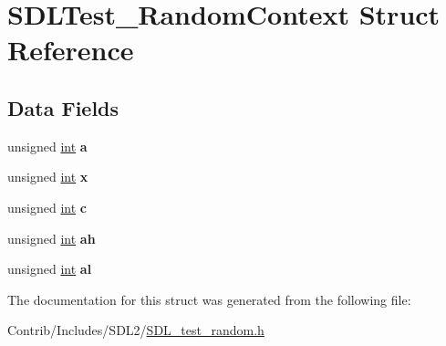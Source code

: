 \hypertarget{struct_s_d_l_test___random_context}{}\section{S\+D\+L\+Test\+\_\+\+Random\+Context Struct Reference}
\label{struct_s_d_l_test___random_context}
\subsection*{Data Fields}
\begin{DoxyCompactItemize}
\item 
unsigned \hyperlink{_s_d_l__thread_8h_a6a64f9be4433e4de6e2f2f548cf3c08e}{int} {\bfseries a}\hypertarget{struct_s_d_l_test___random_context_a0ea8a85723620c90be9fd2a693f12a59}{}\label{struct_s_d_l_test___random_context_a0ea8a85723620c90be9fd2a693f12a59}

\item 
unsigned \hyperlink{_s_d_l__thread_8h_a6a64f9be4433e4de6e2f2f548cf3c08e}{int} {\bfseries x}\hypertarget{struct_s_d_l_test___random_context_a676e0da0ef83bbbdf42538e54b97506b}{}\label{struct_s_d_l_test___random_context_a676e0da0ef83bbbdf42538e54b97506b}

\item 
unsigned \hyperlink{_s_d_l__thread_8h_a6a64f9be4433e4de6e2f2f548cf3c08e}{int} {\bfseries c}\hypertarget{struct_s_d_l_test___random_context_a6ce17b018c47d0f1d0e53a458f741ad3}{}\label{struct_s_d_l_test___random_context_a6ce17b018c47d0f1d0e53a458f741ad3}

\item 
unsigned \hyperlink{_s_d_l__thread_8h_a6a64f9be4433e4de6e2f2f548cf3c08e}{int} {\bfseries ah}\hypertarget{struct_s_d_l_test___random_context_a48cec5b99e2fffb97808b6fbe2148156}{}\label{struct_s_d_l_test___random_context_a48cec5b99e2fffb97808b6fbe2148156}

\item 
unsigned \hyperlink{_s_d_l__thread_8h_a6a64f9be4433e4de6e2f2f548cf3c08e}{int} {\bfseries al}\hypertarget{struct_s_d_l_test___random_context_a04d0a8f77c6e5708b48cc7659df57dfb}{}\label{struct_s_d_l_test___random_context_a04d0a8f77c6e5708b48cc7659df57dfb}

\end{DoxyCompactItemize}


The documentation for this struct was generated from the following file\+:\begin{DoxyCompactItemize}
\item 
Contrib/\+Includes/\+S\+D\+L2/\hyperlink{_s_d_l__test__random_8h}{S\+D\+L\+\_\+test\+\_\+random.\+h}\end{DoxyCompactItemize}
